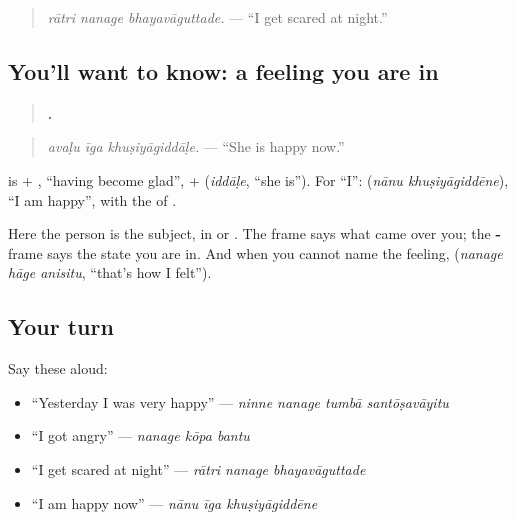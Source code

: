 \begin{quote}
\emph{rātri nanage bhayavāguttade.} — \textquotedblleft{}I get scared at night.\textquotedblright{}
\end{quote}

\subsection*{You'll want to know: a feeling you are in}
\begin{quote}
\textbf{  .}
\end{quote}

\begin{quote}
\emph{avaḷu īga khuṣiyāgiddāḷe.} — \textquotedblleft{}She is happy now.\textquotedblright{}
\end{quote}

\textbf{} is \textbf{} + \textbf{}, \textquotedblleft{}having become glad\textquotedblright{}, + \textbf{} (\emph{iddāḷe}, \textquotedblleft{}she is\textquotedblright{}). For \textquotedblleft{}I\textquotedblright{}: \textbf{ } (\emph{nānu khuṣiyāgiddēne}), \textquotedblleft{}I am happy\textquotedblright{}, with the \textbf{} of \textbf{ }.

Here the person is the subject, in \textbf{} or \textbf{}. The \textbf{} frame says what came over you; the \textbf{-} frame says the state you are in. And when you cannot name the feeling, \textbf{  } (\emph{nanage hāge anisitu}, \textquotedblleft{}that's how I felt\textquotedblright{}).

\subsection*{Your turn}
Say these aloud:

\begin{itemize}
\raggedright
  \item \textquotedblleft{}Yesterday I was very happy\textquotedblright{} — \emph{ninne nanage tumbā santōṣavāyitu}
  \item \textquotedblleft{}I got angry\textquotedblright{} — \emph{nanage kōpa bantu}
  \item \textquotedblleft{}I get scared at night\textquotedblright{} — \emph{rātri nanage bhayavāguttade}
  \item \textquotedblleft{}I am happy now\textquotedblright{} — \emph{nānu īga khuṣiyāgiddēne}
\end{itemize}

